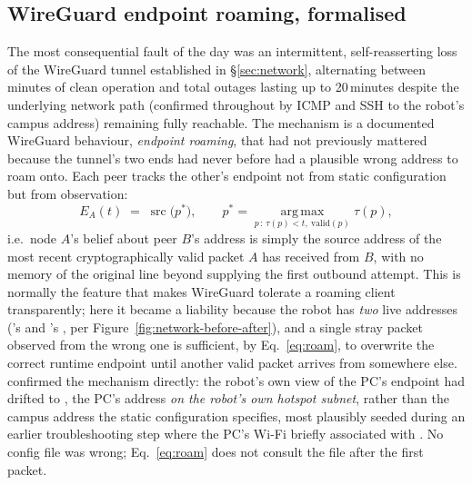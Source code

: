 \subsection{WireGuard endpoint roaming, formalised}
\label{sec:wgroam}
The most consequential fault of the day was an intermittent, self-reasserting
loss of the WireGuard tunnel established in \S\ref{sec:network}, alternating
between minutes of clean operation and total outages lasting up to
20\,minutes despite the underlying network path (confirmed throughout by
ICMP and SSH to the robot's campus address) remaining fully reachable. The
mechanism is a documented WireGuard behaviour, \emph{endpoint roaming},
that had not previously mattered because the tunnel's two ends had never
before had a plausible wrong address to roam onto. Each peer tracks the
other's endpoint not from static configuration but from observation:
\begin{equation}
E_A(t) \;=\; \operatorname{src}\!\big(p^{*}\big), \qquad
p^{*} = \operatorname*{arg\,max}_{p \,:\, \tau(p) < t,\ \mathrm{valid}(p)} \tau(p),
\label{eq:roam}
\end{equation}
i.e.\ node $A$'s belief about peer $B$'s address is simply the source
address of the most recent cryptographically valid packet $A$ has received
from $B$, with no memory of the original  line beyond
supplying the first outbound attempt. This is normally the feature that
makes WireGuard tolerate a roaming client transparently; here it became a
liability because the robot has \emph{two} live addresses ('s
 and 's , per
Figure~\ref{fig:network-before-after}), and a single stray packet observed
from the wrong one is sufficient, by Eq.~\eqref{eq:roam}, to overwrite the
correct runtime endpoint until another valid packet arrives from
somewhere else.  confirmed the mechanism directly: the
robot's own view of the PC's endpoint had drifted to
, the PC's address \emph{on the robot's own hotspot
subnet}, rather than the campus address the static configuration
specifies, most plausibly seeded during an earlier troubleshooting step
where the PC's Wi-Fi briefly associated with . No
config file was wrong; Eq.~\eqref{eq:roam} does not consult the file after
the first packet.

